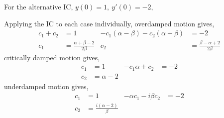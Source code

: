 \begin{enumerate}
\begin{enumerate}
                    For the alternative IC, $ y(0) = 1,\ y'(0) = -2 $, \par
                    Applying the IC to each case individually, overdamped motion gives,
                    \begin{align}
                        c_{1} + c_{2} & = 1                                 &
                        -c_{1}(\alpha - \beta) - c_{2}(\alpha + \beta)
                                      & = -2                                  \\
                        c_{1}         & = \frac{\alpha + \beta - 2}{2\beta} &
                        c_{2}         & = \frac{\beta - \alpha + 2}{2\beta}
                    \end{align}
                    critically damped motion gives,
                    \begin{align}
                        c_{1} & = 1          & -c_{1}\alpha + c_{2} & = -2 \\
                        c_{2} & = \alpha - 2
                    \end{align}
                    underdamped motion gives,
                    \begin{align}
                        c_{1}                        & = 1                           &
                        -\alpha c_{1} - i\beta c_{2} & = -2                            \\
                        c_{2}                        & = \frac{i(\alpha - 2)}{\beta}
                    \end{align}

                    \begin{figure}[H]
                        \centering
                    \end{figure}


\end{enumerate}
\end{enumerate}
